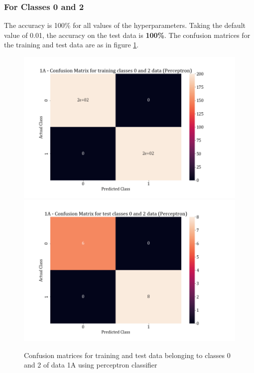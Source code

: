 \documentclass[11pt,a4paper]{article}
\begin{document}
\subsubsection{For Classes 0 and 2}

The accuracy is 100\% for all values of the hyperparameters. Taking the default value of 0.01, the accuracy on the test data is \textbf{100\%}. The confusion matrices for the training and test data are as in figure \ref{fig:perc_conf_02}.
\begin{figure}[H]
    \centering
    \includegraphics[scale=0.27]{images/perceptron_training classes 0 and 2_confmat.png}
    \includegraphics[scale = 0.27]{images/perceptron_test classes 0 and 2_confmat.png}
    \caption{Confusion matrices for training and test data belonging to classes 0 and 2 of data 1A using perceptron classifier}
    \label{fig:perc_conf_02}
\end{figure}
\end{document}
